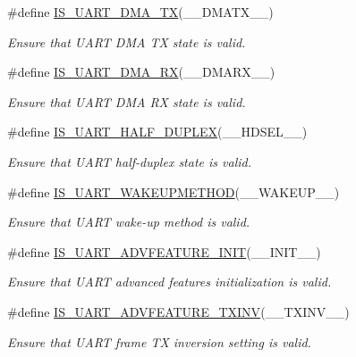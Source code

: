 \begin{DoxyCompactItemize}
\#define \hyperlink{group___u_a_r_t___private___macros_ga433107c59f6d1c66a38e53e38fdc0a57}{I\+S\+\_\+\+U\+A\+R\+T\+\_\+\+D\+M\+A\+\_\+\+TX}(\+\_\+\+\_\+\+D\+M\+A\+T\+X\+\_\+\+\_\+)
\begin{DoxyCompactList}\small\item\em Ensure that U\+A\+RT D\+MA TX state is valid. \end{DoxyCompactList}\item 
\#define \hyperlink{group___u_a_r_t___private___macros_ga85c4c9339de2076106942cd9ab61ad77}{I\+S\+\_\+\+U\+A\+R\+T\+\_\+\+D\+M\+A\+\_\+\+RX}(\+\_\+\+\_\+\+D\+M\+A\+R\+X\+\_\+\+\_\+)
\begin{DoxyCompactList}\small\item\em Ensure that U\+A\+RT D\+MA RX state is valid. \end{DoxyCompactList}\item 
\#define \hyperlink{group___u_a_r_t___private___macros_ga2298a324be00d275d98b336569ee3f97}{I\+S\+\_\+\+U\+A\+R\+T\+\_\+\+H\+A\+L\+F\+\_\+\+D\+U\+P\+L\+EX}(\+\_\+\+\_\+\+H\+D\+S\+E\+L\+\_\+\+\_\+)
\begin{DoxyCompactList}\small\item\em Ensure that U\+A\+RT half-\/duplex state is valid. \end{DoxyCompactList}\item 
\#define \hyperlink{group___u_a_r_t___private___macros_ga144aecf3ad6ca3ce6653ae113c9a6141}{I\+S\+\_\+\+U\+A\+R\+T\+\_\+\+W\+A\+K\+E\+U\+P\+M\+E\+T\+H\+OD}(\+\_\+\+\_\+\+W\+A\+K\+E\+U\+P\+\_\+\+\_\+)
\begin{DoxyCompactList}\small\item\em Ensure that U\+A\+RT wake-\/up method is valid. \end{DoxyCompactList}\item 
\#define \hyperlink{group___u_a_r_t___private___macros_gad91bec43fbbaa25cec138ef8fcfbdad5}{I\+S\+\_\+\+U\+A\+R\+T\+\_\+\+A\+D\+V\+F\+E\+A\+T\+U\+R\+E\+\_\+\+I\+N\+IT}(\+\_\+\+\_\+\+I\+N\+I\+T\+\_\+\+\_\+)
\begin{DoxyCompactList}\small\item\em Ensure that U\+A\+RT advanced features initialization is valid. \end{DoxyCompactList}\item 
\#define \hyperlink{group___u_a_r_t___private___macros_ga4295a61b0afe152975609cedb9034fdc}{I\+S\+\_\+\+U\+A\+R\+T\+\_\+\+A\+D\+V\+F\+E\+A\+T\+U\+R\+E\+\_\+\+T\+X\+I\+NV}(\+\_\+\+\_\+\+T\+X\+I\+N\+V\+\_\+\+\_\+)
\begin{DoxyCompactList}\small\item\em Ensure that U\+A\+RT frame TX inversion setting is valid. \end{DoxyCompactList}\item 

\end{DoxyCompactItemize}

